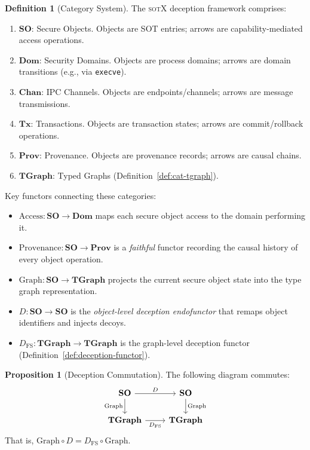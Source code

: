 \documentclass[11pt,a4paper]{article}
\theoremstyle{definition}
\newtheorem{definition}{Definition}[section]
\newtheorem{proposition}[theorem]{Proposition}
\theoremstyle{remark}
\newcommand{\sotx}{\textsc{sotX}}
\newcommand{\cat}[1]{\ensuremath{\mathbf{#1}}}
\begin{document}
\begin{definition}[Category System]
\label{def:cat-system}
The \sotx{} deception framework comprises:
\begin{enumerate}[label=(\roman*)]
\item $\cat{SO}$: Secure Objects. Objects are SOT entries; arrows are
  capability-mediated access operations.
\item $\cat{Dom}$: Security Domains. Objects are process domains;
  arrows are domain transitions (e.g., via \texttt{execve}).
\item $\cat{Chan}$: IPC Channels. Objects are endpoints/channels;
  arrows are message transmissions.
\item $\cat{Tx}$: Transactions. Objects are transaction states; arrows
  are commit/rollback operations.
\item $\cat{Prov}$: Provenance. Objects are provenance records; arrows
  are causal chains.
\item $\cat{TGraph}$: Typed Graphs (Definition~\ref{def:cat-tgraph}).
\end{enumerate}
\end{definition}

Key functors connecting these categories:

\begin{itemize}[leftmargin=1.4em]
\item $\mathrm{Access} : \cat{SO} \to \cat{Dom}$ maps each secure
  object access to the domain performing it.
\item $\mathrm{Provenance} : \cat{SO} \to \cat{Prov}$ is a
  \emph{faithful} functor recording the causal history of every object
  operation.
\item $\mathrm{Graph} : \cat{SO} \to \cat{TGraph}$ projects the
  current secure object state into the type graph representation.
\item $D : \cat{SO} \to \cat{SO}$ is the \emph{object-level deception
  endofunctor} that remaps object identifiers and injects decoys.
\item $D_{\mathrm{FS}} : \cat{TGraph} \to \cat{TGraph}$ is the
  graph-level deception functor (Definition~\ref{def:deception-functor}).
\end{itemize}

\begin{proposition}[Deception Commutation]
\label{prop:deception-commutes}
The following diagram commutes:
\[
\begin{tikzcd}
\cat{SO} \arrow[r, "D"] \arrow[d, "\mathrm{Graph}"'] &
  \cat{SO} \arrow[d, "\mathrm{Graph}"] \\
\cat{TGraph} \arrow[r, "D_{\mathrm{FS}}"'] & \cat{TGraph}
\end{tikzcd}
\]
That is, $\mathrm{Graph} \circ D = D_{\mathrm{FS}} \circ \mathrm{Graph}$.
\end{proposition}
\end{document}
